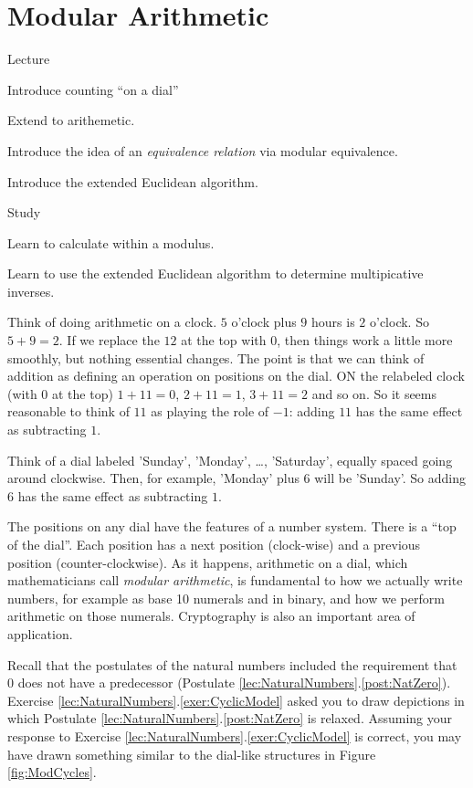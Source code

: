 \chapter{Modular Arithmetic}

\begin{goals} 
	\begin{goal}{Lecture}
		\item Introduce counting ``on a dial''
		\item Extend to arithemetic.
		\item Introduce the idea of an \emph{equivalence relation} via modular equivalence.
		\item Introduce the extended Euclidean algorithm.
	\end{goal}
	
	\begin{goal}{Study}
		\item Learn to calculate within a modulus.
		\item Learn to use the extended Euclidean algorithm to determine multipicative inverses.
	\end{goal}
\end{goals}

Think of doing arithmetic on a clock. $5$ o'clock plus $9$ hours is $2$ o'clock. So $5+9=2$. If we replace the $12$ at the top with $0$, then things work a little more smoothly, but nothing essential changes. The point is that we can think of addition as defining an operation on positions on the dial. ON the relabeled clock (with $0$ at the top) $1 + 11 = 0$, $2+11=1$, $3+11=2$ and so on. So it seems reasonable to think of $11$ as playing the role of $-1$: adding $11$ has the same effect as subtracting $1$.    

Think of a dial labeled 'Sunday', 'Monday', \ldots, 'Saturday', equally spaced going around clockwise. Then, for example, 'Monday' plus $6$ will be 'Sunday'. So adding $6$ has the same effect as subtracting $1$.

The positions on any dial have the features of a number system. There is a ``top of the dial''. Each position has a next position (clock-wise) and a previous position (counter-clockwise). As it happens, arithmetic on a dial, which mathematicians call \emph{modular arithmetic}, is fundamental to how we actually write numbers, for example as base 10 numerals and in binary, and how we perform arithmetic on those numerals. Cryptography is also an important area of application.
 
Recall that the postulates of the natural numbers included the requirement that $0$ does not have  a predecessor (Postulate \ref{lec:NaturalNumbers}.\ref{post:NatZero}).  Exercise \ref{lec:NaturalNumbers}.\ref{exer:CyclicModel} asked you to draw depictions in which Postulate \ref{lec:NaturalNumbers}.\ref{post:NatZero} is relaxed. 
Assuming your response to Exercise \ref{lec:NaturalNumbers}.\ref{exer:CyclicModel} is correct, you may have drawn something similar to the dial-like structures in Figure \ref{fig:ModCycles}.

